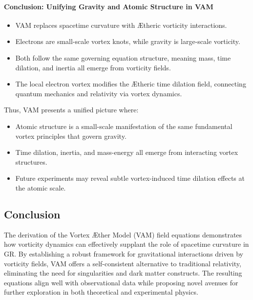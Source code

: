 \paragraph{Conclusion: Unifying Gravity and Atomic Structure in VAM}
\begin{itemize}
    \item VAM replaces spacetime curvature with \AE theric vorticity interactions.
    \item Electrons are small-scale vortex knots, while gravity is large-scale vorticity.
    \item Both follow the same governing equation structure, meaning mass, time dilation, and inertia all emerge from vorticity fields.
    \item The local electron vortex modifies the \AE theric time dilation field, connecting quantum mechanics and relativity via vortex dynamics.
\end{itemize}
Thus, VAM presents a unified picture where:
\begin{itemize}
    \item Atomic structure is a small-scale manifestation of the same fundamental vortex principles that govern gravity.
    \item Time dilation, inertia, and mass-energy all emerge from interacting vortex structures.
    \item Future experiments may reveal subtle vortex-induced time dilation effects at the atomic scale.
\end{itemize}

\subsection{Conclusion}
The derivation of the Vortex \AE ther Model (VAM) field equations demonstrates how vorticity dynamics can effectively supplant the role of spacetime curvature in GR. By establishing a robust framework for gravitational interactions driven by vorticity fields, VAM offers a self-consistent alternative to traditional relativity, eliminating the need for singularities and dark matter constructs. The resulting equations align well with observational data while proposing novel avenues for further exploration in both theoretical and experimental physics.
